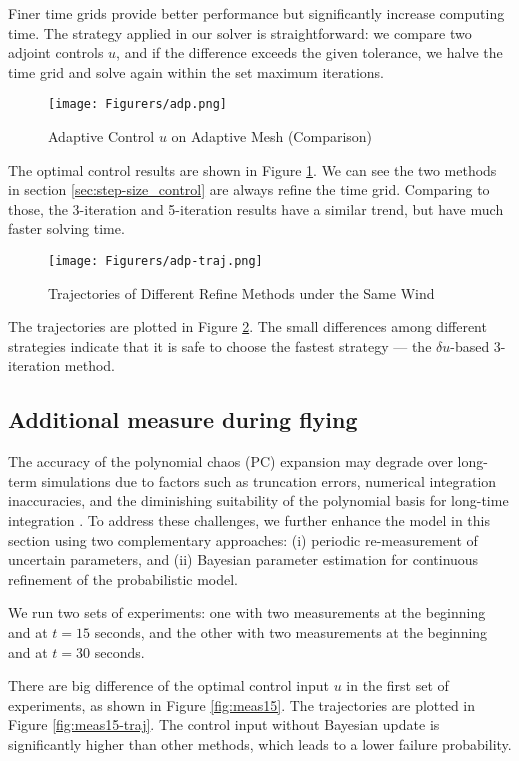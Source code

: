 Finer time grids provide better performance but significantly increase computing time. The strategy applied in our solver is straightforward: we compare two adjoint controls $u$, and if the difference exceeds the given tolerance, we halve the time grid and solve again within the set maximum iterations.

\begin{figure}
    \centering
    \texttt{[image: Figurers/adp.png]}
    \caption{Adaptive Control $u$ on Adaptive Mesh (Comparison)}
    \label{fig:adp}
\end{figure}

The optimal control results are shown in Figure \ref{fig:adp}. We can see the two methods in section \ref{sec:step-size_control} are always refine the time grid. Comparing to those, the 3-iteration and 5-iteration results have a similar trend, but have much faster solving time.

\begin{figure}
    \centering
    \texttt{[image: Figurers/adp-traj.png]}
    \caption{Trajectories of Different Refine Methods under the Same Wind}
    \label{fig:adp-traj}
\end{figure}

The trajectories are plotted in Figure \ref{fig:adp-traj}. The small differences among different strategies indicate that it is safe to choose the fastest strategy — the $\delta u$-based 3-iteration method.

\subsection{Additional measure during flying}
The accuracy of the polynomial chaos (PC) expansion may degrade over long-term simulations due to factors such as truncation errors, numerical integration inaccuracies, and the diminishing suitability of the polynomial basis for long-time integration \cite{gerritsma2010time, xu2018propagating}. To address these challenges, we further enhance the model in this section using two complementary approaches: (i) periodic re-measurement of uncertain parameters, and (ii) Bayesian parameter estimation for continuous refinement of the probabilistic model.

We run two sets of experiments: one with two measurements at the beginning and at $t=15$ seconds, and the other with two measurements at the beginning and at $t=30$ seconds.

There are big difference of the optimal control input $u$ in the first set of experiments, as shown in Figure \ref{fig:meas15}. The trajectories are plotted in Figure \ref{fig:meas15-traj}. The control input without Bayesian update is significantly higher than other methods, which leads to a lower failure probability.

